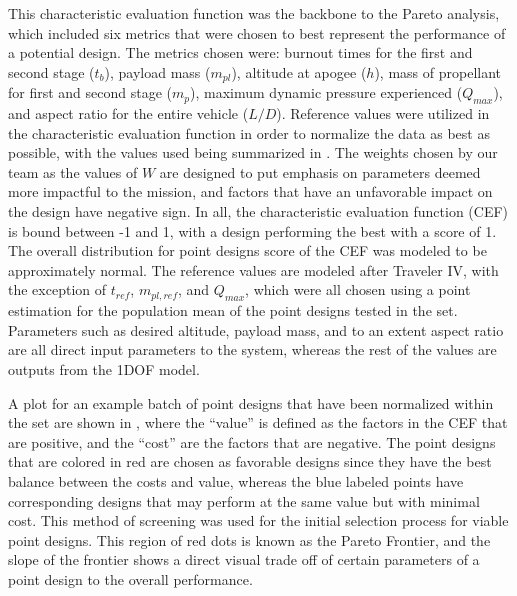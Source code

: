 This characteristic evaluation function was the backbone to the Pareto analysis, which included six metrics that were chosen to best represent the performance of a potential design. The metrics chosen were: burnout times for the first and second stage (\(t_b\)), payload mass (\(m_{pl}\)), altitude at apogee (\(h\)), mass of propellant for first and second stage (\(m_p\)), maximum dynamic pressure experienced (\(Q_{max}\)), and aspect ratio for the entire vehicle (\(L/D\)). Reference values were utilized in the characteristic evaluation function in order to normalize the data as best as possible, with the values used being summarized in . The weights chosen by our team as the values of \(W\) are designed to put emphasis on parameters deemed more impactful to the mission, and factors that have an unfavorable impact on the design have negative sign. In all, the characteristic evaluation function (CEF) is bound between -1 and 1, with a design performing the best with a score of 1. The overall distribution for point designs score of the CEF was modeled to be approximately normal. The reference values are modeled after Traveler IV, with the exception of \(t_{ref}\), \(m_{pl,ref}\), and \(Q_{max}\), which were all chosen using a point estimation for the population mean of the point designs tested in the set. Parameters such as desired altitude, payload mass, and to an extent aspect ratio are all direct input parameters to the system, whereas the rest of the values are outputs from the 1DOF model.

A plot for an example batch of point designs that have been normalized within the set are shown in , where the ``value'' is defined as the factors in the CEF that are positive, and the ``cost'' are the factors that are negative. The point designs that are colored in red are chosen as favorable designs since they have the best balance between the costs and value, whereas the blue labeled points have corresponding designs that may perform at the same value but with minimal cost. This method of screening was used for the initial selection process for viable point designs. This region of red dots is known as the Pareto Frontier, and the slope of the frontier shows a direct visual trade off of certain parameters of a point design to the overall performance.

